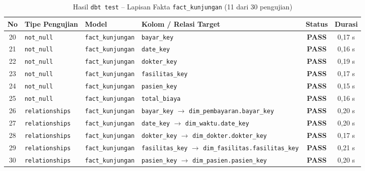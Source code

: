 \begin{table}[H]
\centering
\caption{Hasil \texttt{dbt test} -- Lapisan Fakta \texttt{fact\_kunjungan} (11 dari 30 pengujian)}
\small
\begin{tabularx}{\linewidth}{cp{2.8cm}p{2.2cm}Xcc}
\toprule
\textbf{No} & \textbf{Tipe Pengujian} & \textbf{Model} & \textbf{Kolom / Relasi Target} & \textbf{Status} & \textbf{Durasi} \\
\midrule
20 & \texttt{not\_null} & \texttt{fact\_kunjungan} & \texttt{bayar\_key}      & \textcolor{green!60!black}{\textbf{PASS}} & 0,17 s \\
21 & \texttt{not\_null} & \texttt{fact\_kunjungan} & \texttt{date\_key}       & \textcolor{green!60!black}{\textbf{PASS}} & 0,16 s \\
22 & \texttt{not\_null} & \texttt{fact\_kunjungan} & \texttt{dokter\_key}     & \textcolor{green!60!black}{\textbf{PASS}} & 0,19 s \\
23 & \texttt{not\_null} & \texttt{fact\_kunjungan} & \texttt{fasilitas\_key}  & \textcolor{green!60!black}{\textbf{PASS}} & 0,17 s \\
24 & \texttt{not\_null} & \texttt{fact\_kunjungan} & \texttt{pasien\_key}     & \textcolor{green!60!black}{\textbf{PASS}} & 0,15 s \\
25 & \texttt{not\_null} & \texttt{fact\_kunjungan} & \texttt{total\_biaya}    & \textcolor{green!60!black}{\textbf{PASS}} & 0,16 s \\
\midrule
26 & \texttt{relationships} & \texttt{fact\_kunjungan} & \texttt{bayar\_key} $\to$ \texttt{dim\_pembayaran.bayar\_key}    & \textcolor{green!60!black}{\textbf{PASS}} & 0,20 s \\
27 & \texttt{relationships} & \texttt{fact\_kunjungan} & \texttt{date\_key} $\to$ \texttt{dim\_waktu.date\_key}           & \textcolor{green!60!black}{\textbf{PASS}} & 0,20 s \\
28 & \texttt{relationships} & \texttt{fact\_kunjungan} & \texttt{dokter\_key} $\to$ \texttt{dim\_dokter.dokter\_key}      & \textcolor{green!60!black}{\textbf{PASS}} & 0,17 s \\
29 & \texttt{relationships} & \texttt{fact\_kunjungan} & \texttt{fasilitas\_key} $\to$ \texttt{dim\_fasilitas.fasilitas\_key} & \textcolor{green!60!black}{\textbf{PASS}} & 0,21 s \\
30 & \texttt{relationships} & \texttt{fact\_kunjungan} & \texttt{pasien\_key} $\to$ \texttt{dim\_pasien.pasien\_key}      & \textcolor{green!60!black}{\textbf{PASS}} & 0,20 s \\
\bottomrule
\end{tabularx}
\end{table}
 
